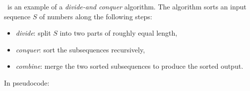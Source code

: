 %
%
%
%

\pagestyle{headandfoot}
\runningfootrule
{}
\runningheader{}{}{}
\firstpagefooter{}{}{}

\begin{questions}

\question
\mergesort\ is an example of a {\em divide-and conquer} algorithm. The algorithm
sorts an input sequence $S$ of numbers along the following steps:
%
\begin{itemize}
\item {\em divide}: split $S$ into two parts of roughly equal length,
\item {\em conquer}: sort the subsequences recursively,
\item {\em combine}: merge the two sorted subsequences to produce the sorted output.
\end{itemize}
%
In pseudocode:
%
\begin{center}
  \begin{minipage}{.5\linewidth}
    \begin{algorithm}[H]
      \label{alg:merge-sort}
%
      \dontprintsemicolon
      \setalcaphskip{0ex}
%
      \caption{\mergesort($S$, $p$, $r$)}
      \vspace{.5em}
%
%
      \vspace{.5em}
%
    \end{algorithm}
  \end{minipage}
\end{center}
%
\end{questions}
